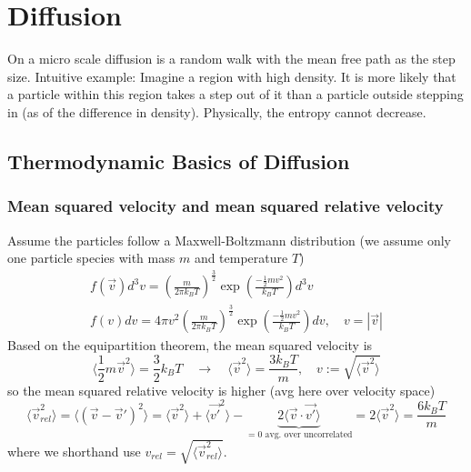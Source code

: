 \section{Diffusion}
\thispagestyle{plain}

On a micro scale diffusion is a random walk with the mean free path as the step size.
\textcolor{blue1}{Intuitive example}: Imagine a region with high density. It is more likely that a particle
within this region takes a step out of it than a particle outside stepping in (as of the 
difference in density). Physically, the entropy cannot decrease.

\subsection{Thermodynamic Basics of Diffusion}
\subsubsection{Mean squared velocity and mean squared relative velocity}
Assume the particles follow a Maxwell-Boltzmann distribution (we assume only one particle species with mass $m$ and temperature $T$)
\begin{equation}
    \begin{gathered}
    f(\vec{v}) d^3 v=\left(\frac{m}{2 \pi k_B T}\right)^{\frac{3}{2}} \exp \left(\frac{-\frac{1}{2} m v^2}{k_B T}\right) d^3 v \\
    f(v) d v=4 \pi v^2\left(\frac{m}{2 \pi k_B T}\right)^{\frac{3}{2}} \exp \left(\frac{-\frac{1}{2} m v^2}{k_B T}\right) d v, \quad v=|\vec{v}|
    \end{gathered}
\end{equation}
Based on the equipartition theorem, the mean squared velocity is
\begin{equation}
    \langle \frac{1}{2} m \vec{v}^2 \rangle = \frac{3}{2} k_B T \quad \rightarrow \quad \langle \vec{v}^2 \rangle = \frac{3k_B T}{m},  \quad v:= \sqrt{\langle \vec{v}^2 \rangle}
\end{equation}
so the mean squared relative velocity is higher (avg here over velocity space)
\begin{equation}
    \langle \vec{v}_{rel}^2 \rangle = \langle (\vec{v} - \vec{v}')^2 \rangle = \langle \vec{v}^2 \rangle + \langle \vec{v'}^2 \rangle - \underbrace{2 \langle \vec{v} \cdot \vec{v'} \rangle}_{=0 \text{ avg. over uncorrelated}} = 2 \langle \vec{v}^2 \rangle = \frac{6 k_B T}{m}
\end{equation}
where we shorthand use $v_{rel} = \sqrt{\langle \vec{v}_{rel}^2 \rangle}$.

